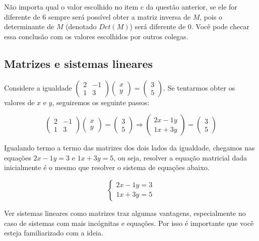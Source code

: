 \documentclass[main_estudante.tex]{subfiles}
\begin{document}
Não importa qual o valor escolhido no item c da questão anterior, se ele for diferente de 6 sempre será possível obter a matriz inversa de $M$, pois o determinante de $M$ (denotado $Det(M)$) será diferente de 0. Você pode checar essa conclusão com os valores escolhidos por outros colegas.

\subsection*{Matrizes e sistemas lineares}

Considere a igualdade $\begin{pmatrix}2 & -1 \\ 1 & 3\end{pmatrix} \begin{pmatrix}x \\ y\end{pmatrix} = \begin{pmatrix}3 \\ 5\end{pmatrix}$. Se tentarmos obter os valores de $x$ e $y$, seguiremos os seguinte passos:

$$
\begin{pmatrix}2 & -1 \\ 1 & 3\end{pmatrix} \begin{pmatrix}x \\ y\end{pmatrix} = \begin{pmatrix}3 \\ 5\end{pmatrix} \Rightarrow \begin{pmatrix}2x-1y \\ 1x+3y\end{pmatrix} = \begin{pmatrix}3 \\ 5\end{pmatrix}
$$

Igualando termo a termo das matrizes dos dois lados da igualdade, chegamos nas equações $2x-1y=3$ e $1x+3y=5$, ou seja, resolver a equação matricial dada inicialmente é o mesmo que resolver o sistema de equações abaixo.

$$\begin{cases}2x-1y=3\\1x+3y=5\end{cases}$$

Ver sistemas lineares como matrizes traz algumas vantagens, especialmente no caso de sistemas com mais incógnitas e equações. Por isso é importante que você esteja familiarizado com a ideia.
\end{document}
